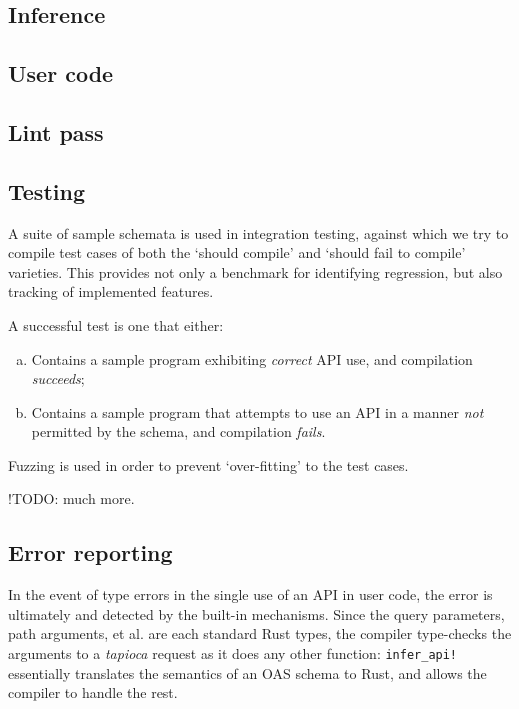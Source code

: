 \subsection{Inference} \label{impl:inference}

\subsection{User code} \label{impl:user-code}

\subsection{Lint pass} \label{impl:lint}

\subsection{Testing} \label{impl:testing}

A suite of sample schemata is used in integration testing, against which we try to compile test cases of both the `should compile' and `should fail to compile' varieties. This provides not only a benchmark for identifying regression, but also tracking of implemented features.

A successful test is one that either:
\begin{enumerate}[(a)]
	\item Contains a sample program exhibiting \emph{correct} API use, and compilation \emph{succeeds};
	\item Contains a sample program that attempts to use an API in a manner \emph{not} permitted by the schema, and compilation \emph{fails}.
\end{enumerate}

Fuzzing is used in order to prevent `over-fitting' to the test cases.

!TODO: much more.

\subsection{Error reporting} \label{impl:reporting}

In the event of type errors in the single use of an API in user code, the error is ultimately and detected by the built-in mechanisms. Since the query parameters, path arguments, et al. are each standard Rust types, the compiler type-checks the arguments to a \emph{tapioca} request as it does any other function: \texttt{infer_api!} essentially translates the semantics of an OAS schema to Rust, and allows the compiler to handle the rest.

